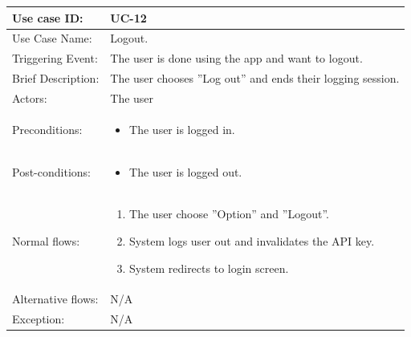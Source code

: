 \begin{table}[]
\begin{tabular}{| m{4cm} | m{11cm} |}
\hline
Use case ID:       & UC-12 \\ \hline
Use Case Name:     & Logout. \\ \hline
Triggering Event:  & The user is done using the app and want to logout. \\ \hline
Brief Description: & The user chooses ''Log out'' and ends their logging session. \\ \hline
Actors:            & The user \\ \hline
Preconditions:     & \begin{itemize}
    \item The user is logged in.
\end{itemize} \\ \hline
Post-conditions:   & \begin{itemize}
    \item The user is logged out.
\end{itemize} \\ \hline
Normal flows:      & \begin{enumerate}
    \item The user choose ''Option'' and ''Logout''.
    \item System logs user out and invalidates the API key.
    \item System redirects to login screen.
\end{enumerate} \\ \hline
Alternative flows: & N/A \\ \hline
Exception: & N/A \\ \hline
\end{tabular}
\end{table}